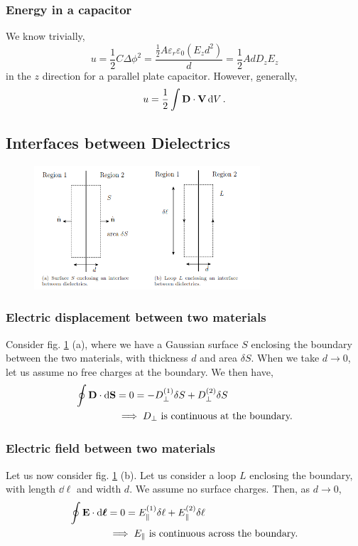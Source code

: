 \documentclass{book}
\begin{document}
\subsubsection{Energy in a capacitor}
We know trivially,
\begin{equation}
	u = \frac{1}{2}C \Delta \phi^2 =  \frac{\frac{1}{2}A\varepsilon_r\varepsilon_0\left(E_zd^2\right)}{d} = \frac{1}{2}AdD_zE_z
\end{equation}
in the $z$ direction for a parallel plate capacitor. However, generally,
\begin{equation}
	u = \frac{1}{2}\int \vb{D}\cdot\vb{V}\dd{V}.
\end{equation}
\subsection{Interfaces between Dielectrics}
\begin{figure}
	\centering
	\includegraphics[width=0.75\textwidth]{interface.png}
	\caption{}
	\label{fig:interface}
\end{figure}
\subsubsection{Electric displacement between two materials}
Consider fig. \ref{fig:interface} (a), where we have a Gaussian surface $S$ enclosing the boundary between the two materials, with thickness $d$ and area $\delta S$. When we take $d \to 0$, let us assume no free charges at the boundary. We then have,
\begin{equation}
	\begin{split}
	\oint\vb{D}\cdot\dd{\vb{S}} & = 0 = -D_{\perp}^{(1)}\delta S + D_{\perp}^{(2)}\delta S \\
	& \implies D_{\perp}\text{ is continuous at the boundary.}
	\end{split}
\end{equation}
\subsubsection{Electric field between two materials}
Let us now consider fig. \ref{fig:interface} (b). Let us consider a loop $L$ enclosing the boundary, with length $\dd{\ell}$ and width $d$. We assume no surface charges. Then, as $d \to 0$,
\begin{equation}
	\begin{split}
	\oint \vb{E} \cdot\dd{\vb*{\ell}} & = 0 = E_{\parallel}^{(1)}\delta \ell + E_{\parallel}^{(2)}\delta\ell \\
	& \implies E_{\parallel}\text{ is continuous across the boundary.}
	\end{split}
\end{equation}
\end{document}
